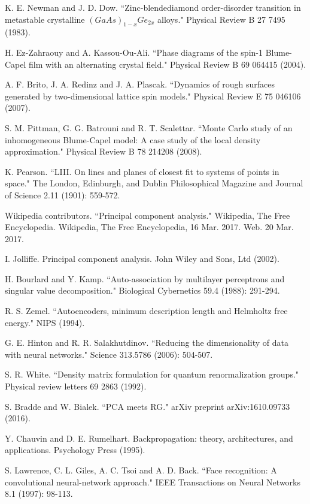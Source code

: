 \documentclass[pra,letterpaper,10pt,twocolumn]{revtex4}
\begin{document}
\begin{thebibliography}{100}
K. E. Newman and J. D. Dow. ``Zinc-blendediamond order-disorder transition in metastable crystalline $(GaAs)_{1-x}Ge_{2x}$ alloys." Physical Review B 27 7495 (1983).

H. Ez-Zahraouy and A. Kassou-Ou-Ali. ``Phase diagrams of the spin-1 Blume-Capel film with an alternating crystal field." Physical Review B 69 064415 (2004).

A. F. Brito, J. A. Redinz and J. A. Plascak. ``Dynamics of rough surfaces generated by two-dimensional lattice spin models." Physical Review E 75 046106 (2007).

S. M. Pittman, G. G. Batrouni and R. T. Scalettar. ``Monte Carlo study of an inhomogeneous Blume-Capel model: A case study of the local density approximation." Physical Review B 78 214208 (2008).

K. Pearson. ``LIII. On lines and planes of closest fit to systems of points in space." The London, Edinburgh, and Dublin Philosophical Magazine and Journal of Science 2.11 (1901): 559-572.

Wikipedia contributors. ``Principal component analysis." Wikipedia, The Free Encyclopedia. Wikipedia, The Free Encyclopedia, 16 Mar. 2017. Web. 20 Mar. 2017.

I. Jolliffe. Principal component analysis. John Wiley and Sons, Ltd (2002).

H. Bourlard and Y. Kamp. ``Auto-association by multilayer perceptrons and singular value decomposition." Biological Cybernetics 59.4 (1988): 291-294.

R. S. Zemel. ``Autoencoders, minimum description length and Helmholtz free energy." NIPS (1994).

G. E. Hinton and R. R. Salakhutdinov. ``Reducing the dimensionality of data with neural networks." Science 313.5786 (2006): 504-507.

S. R. White. ``Density matrix formulation for quantum renormalization groups." Physical review letters 69 2863 (1992).

S. Bradde and W. Bialek. ``PCA meets RG." arXiv preprint arXiv:1610.09733 (2016).

Y. Chauvin and D. E. Rumelhart. Backpropagation: theory, architectures, and applications. Psychology Press (1995).

S. Lawrence, C. L. Giles, A. C. Tsoi and A. D. Back. ``Face recognition: A convolutional neural-network approach." IEEE Transactions on Neural Networks 8.1 (1997): 98-113.


\end{thebibliography}
\end{document}
